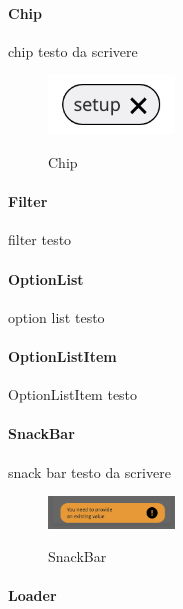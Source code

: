 \paragraph{Chip}\label{par:chip}

chip testo da scrivere

\begin{figure}[ht]
  \centering
  \includegraphics[width=0.3\textwidth, alt={Chip contenente il client id corrente}]{images/frontend/Chip.jpg}
  \caption{Chip}\label{fig:chip}
\end{figure}

\paragraph{Filter}\label{par:filter}

filter testo

\paragraph{OptionList}\label{par:option-list}

option list testo

\paragraph{OptionListItem}\label{par:option-list-item}

OptionListItem testo

\paragraph{SnackBar}\label{par:snack-bar}

snack bar testo da scrivere

\begin{figure}[ht]
  \centering
  \includegraphics[width=0.3\textwidth, alt={Snackbar di errore}]{images/frontend/SnackBar1.jpg}
  \caption{SnackBar}\label{fig:snack-bar}
\end{figure}

\paragraph{Loader}\label{par:loader}

